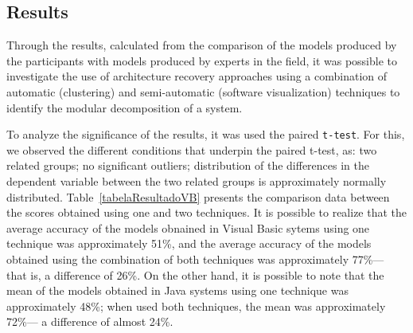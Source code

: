 {




\subsection{Results}%

Through the results, calculated from the comparison of the models produced by the participants with models produced by experts in the field, 
it was possible to investigate the use of architecture recovery approaches using a combination of automatic (clustering) and semi-automatic (software visualization) 
techniques to identify the modular decomposition of a system.  

To analyze the significance of the results, it was used the paired \texttt{t-test}. For this, we observed the different conditions that underpin the paired t-test, as: two related groups; no significant outliers; distribution of the differences in the dependent variable between the two related groups is approximately normally distributed. Table~\ref{tabelaResultadoVB} presents the comparison data between the scores obtained using one and two techniques. It is possible to realize that the average accuracy of the models obnained in Visual Basic sytems using one technique 
was approximately 51\%, and the average accuracy of the models obtained using the combination of both techniques was approximately 77\%--- that is, a difference of 26\%. 
On the other hand, it is possible to note that the mean of the models obtained in Java systems using one technique was approximately 48\%; when used both techniques, 
the mean was approximately 72\%--- a difference of almost 24\%.

}
